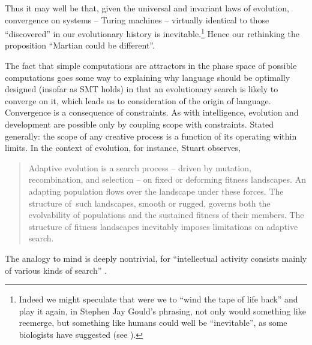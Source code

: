 \documentclass[output=paper]{langsci/langscibook}
\begin{document}
Thus it may well be that, given the universal and invariant laws of evolution,
convergence on systems – Turing machines – virtually identical to those
“discovered” in our evolutionary history is inevitable.\footnote{Indeed we
    might speculate that were we to “wind the tape of life back” and play it
    again, in Stephen Jay Gould’s phrasing, not only would something like 
reemerge, but something like humans could well be “inevitable”, as some
biologists have suggested (see \citealt{ConwayMorris2013}).}  Hence our
rethinking the proposition “Martian could be different”.

The fact that simple computations are attractors in the phase space of possible
computations goes some way to explaining why language should be optimally
designed (insofar as \gls{SMT} holds) in that an evolutionary search is likely to
converge on it, which leads us to consideration of the origin of language.
Convergence is a consequence of constraints. As with intelligence, evolution
and development are possible only by coupling scope with constraints. Stated
generally: the scope of any creative process is a function of its operating
within limits. In the context of evolution, for instance, Stuart
\citet[118]{Kauffman1993} observes, \blockquote{Adaptive evolution is a search
    process – driven by mutation, recombination, and selection – on fixed or
    deforming fitness landscapes. An adapting population flows over the
    landscape under these forces. The structure of~such landscapes, smooth or
    rugged, governs both the evolvability of populations and the sustained
    fitness of their members. The structure of fitness landscapes inevitably
    imposes limitations on adaptive search.} The analogy to mind is deeply
    nontrivial, for “intellectual activity consists mainly of various kinds of
    search” \citep[431]{Turing1948}.
\end{document}
